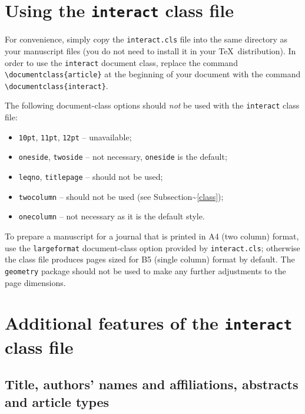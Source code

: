 \documentclass[]{interact}
\theoremstyle{plain}%
\theoremstyle{definition}
\theoremstyle{remark}
\def\tightlist{}
\begin{document}
\hypertarget{using-the-interact-class-file}{%
\section{\texorpdfstring{Using the \texttt{interact} class file}{Using the interact class file}}\label{using-the-interact-class-file}}

For convenience, simply copy the \texttt{interact.cls} file into the same directory as your manuscript files (you do not need to install it in your \TeX~distribution). In order to use the \texttt{interact} document class, replace the command \texttt{\textbackslash{}documentclass\{article\}} at the beginning of your document with the command \texttt{\textbackslash{}documentclass\{interact\}}.

The following document-class options should \emph{not} be used with the \texttt{interact} class file:

\begin{itemize}
\tightlist
\item
  \texttt{10pt}, \texttt{11pt}, \texttt{12pt} -- unavailable;
\item
  \texttt{oneside}, \texttt{twoside} -- not necessary, \texttt{oneside} is the default;
\item
  \texttt{leqno}, \texttt{titlepage} -- should not be used;
\item
  \texttt{twocolumn} -- should not be used (see Subsection\textasciitilde{}\ref{class});
\item
  \texttt{onecolumn} -- not necessary as it is the default style.
\end{itemize}

To prepare a manuscript for a journal that is printed in A4 (two column) format, use the \texttt{largeformat} document-class option provided by \texttt{interact.cls}; otherwise the class file produces pages sized for B5 (single column) format by default. The \texttt{geometry} package should not be used to make any further adjustments to the page dimensions.

\hypertarget{additional-features-of-the-interact-class-file}{%
\section{\texorpdfstring{Additional features of the \texttt{interact} class file}{Additional features of the interact class file}}\label{additional-features-of-the-interact-class-file}}

\hypertarget{title-authors-names-and-affiliations-abstracts-and-article-types}{%
\subsection{Title, authors' names and affiliations, abstracts and article types}\label{title-authors-names-and-affiliations-abstracts-and-article-types}}
\end{document}
